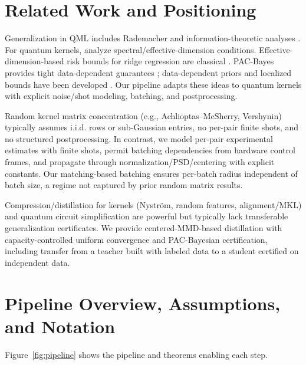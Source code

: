\documentclass{article}
\begin{document}
\section{Related Work and Positioning}
Generalization in QML includes Rademacher and information-theoretic analyses \cite{caro2021generalization, bu2021statistical, banchi2021generalization, sutter2022quantum}. For quantum kernels, \cite{huang2021power, gentinetta2022complexity} analyze spectral/effective-dimension conditions. Effective-dimension-based risk bounds for ridge regression are classical \cite{hsu2014random, bartlett2020benign}. PAC-Bayes provides tight data-dependent guarantees \cite{mcallester1999pac, seeger2002pac, catoni2007pac, maurer2004note, alquier2016properties, thiemann2017strongly}; data-dependent priors and localized bounds have been developed \cite{rivasplata2020pacbayes, lever2013tighter, dziugaite2021role}. Our pipeline adapts these ideas to quantum kernels with explicit noise/shot modeling, batching, and postprocessing.

Random kernel matrix concentration (e.g., Achlioptas--McSherry, Vershynin) typically assumes i.i.d. rows or sub-Gaussian entries, no per-pair finite shots, and no structured postprocessing. In contrast, we model per-pair experimental estimates with finite shots, permit batching dependencies from hardware control frames, and propagate through normalization/PSD/centering with explicit constants. Our matching-based batching ensures per-batch radius independent of batch size, a regime not captured by prior random matrix results.

Compression/distillation for kernels (Nystr\"om, random features, alignment/MKL) \cite{cortes2010two, cortes2012algorithms, bach2013sharp, rudi2015less} and quantum circuit simplification \cite{kyriienko2022generic} are powerful but typically lack transferable generalization certificates. We provide centered-MMD-based distillation with capacity-controlled uniform convergence and PAC-Bayesian certification, including transfer from a teacher built with labeled data to a student certified on independent data.

\section{Pipeline Overview, Assumptions, and Notation}\label{sec:overview}
Figure~\ref{fig:pipeline} shows the pipeline and theorems enabling each step.
\end{document}
